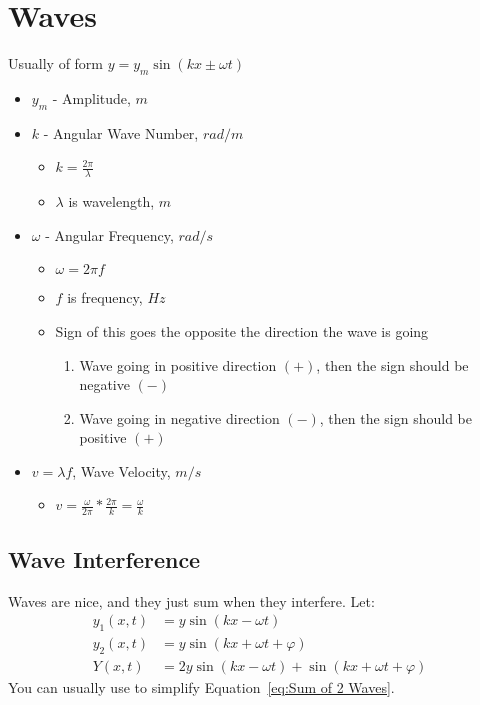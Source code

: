 \documentclass[10pt,letterpaper,final,twoside,notitlepage]{article}
\begin{document}
\section*{Waves} \label{sec:Waves}
{\Large Usually of form $y = y_{m} \sin \left( kx \pm \omega t \right)$}
	\begin{itemize}[noitemsep]
		\item $y_{m}$ - Amplitude, $m$
		\item $k$ - Angular Wave Number, $rad/m$
			\begin{itemize}[noitemsep, nolistsep]
				\item $k = \frac{2 \pi}{\lambda}$
				\item $\lambda$ is wavelength, $m$
			\end{itemize}
		\item $\omega$ - Angular Frequency, $rad/s$
			\begin{itemize}[noitemsep, nolistsep]
				\item $\omega = 2 \pi f$
				\item $f$ is frequency, $Hz$
				\item Sign of this goes the opposite the direction the wave is going
					\begin{enumerate}[noitemsep]
						\item Wave going in positive direction $\left( + \right)$, then the sign should be negative $\left( - \right)$
						\item Wave going in negative direction $\left( - \right)$, then the sign should be positive $\left( + \right)$
					\end{enumerate}
			\end{itemize}
		\item $v = \lambda f$, Wave Velocity, $m/s$
			\begin{itemize}[noitemsep]
				\item $v = \frac{\omega}{2 \pi} * \frac{2 \pi}{k} = \frac{\omega}{k}$
			\end{itemize}
	\end{itemize}

	\subsection*{Wave Interference} \label{subsec:Wave Interference}
	Waves are nice, and they just sum when they interfere. Let: 
	\begin{align}
		y_{1} \left( x, t \right) &= y \sin \left( kx - \omega t \right) \\
		y_{2} \left( x, t \right) &= y \sin \left( kx + \omega t + \varphi \right) \\
		Y \left( x, t \right) &= 2y \sin \left( kx - \omega t \right) + \sin \left( kx + \omega t + \varphi \right) \label{eq:Sum of 2 Waves}
	\end{align}
	You can usually use  to simplify Equation~\ref{eq:Sum of 2 Waves}.
\end{document}

